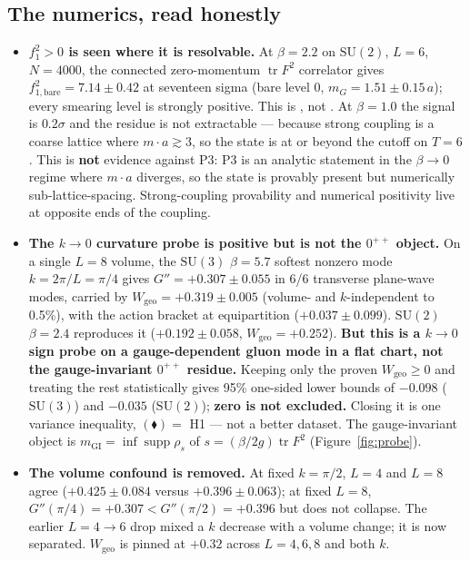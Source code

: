 \subsection{The numerics, read honestly}

\begin{itemize}
\item \textbf{$f_1^2>0$ is seen where it is resolvable.} At $\beta=2.2$ on $\mathrm{SU}(2)$,
  $L=6$, $N=4000$, the connected zero-momentum $\operatorname{tr}F^2$ correlator gives
  $f_{1,\mathrm{bare}}^2=7.14\pm0.42$ at seventeen sigma (bare level 0, $m_G=1.51\pm0.15\,a$);
  every smearing level is strongly positive. This is \LE, not \LT. At $\beta=1.0$ the signal is
  $0.2\sigma$ and the residue is not extractable --- because strong coupling is a coarse lattice
  where $m\cdot a\gtrsim3$, so the state is at or beyond the cutoff on $T=6$. This is \textbf{not}
  evidence against P3: P3 is an analytic statement in the $\beta\to0$ regime where $m\cdot a$
  diverges, so the state is provably present but numerically sub-lattice-spacing. Strong-coupling
  provability and numerical positivity live at opposite ends of the coupling.
\item \textbf{The $k\to0$ curvature probe is positive but is not the $0^{++}$ object.} On a single
  $L=8$ volume, the $\mathrm{SU}(3)$ $\beta=5.7$ softest nonzero mode $k=2\pi/L=\pi/4$ gives
  $G''=+0.307\pm0.055$ in 6/6 transverse plane-wave modes, carried by
  $W_{\mathrm{geo}}=+0.319\pm0.005$ (volume- and $k$-independent to 0.5\%), with the action
  bracket at equipartition ($+0.037\pm0.099$). $\mathrm{SU}(2)$ $\beta=2.4$ reproduces it
  ($+0.192\pm0.058$, $W_{\mathrm{geo}}=+0.252$). \textbf{But this is a $k\to0$ sign probe on a
  gauge-dependent gluon mode in a flat chart, not the gauge-invariant $0^{++}$ residue.} Keeping
  only the proven $W_{\mathrm{geo}}\ge0$ and treating the rest statistically gives 95\% one-sided
  lower bounds of $-0.098$ ($\mathrm{SU}(3)$) and $-0.035$ ($\mathrm{SU}(2)$); \textbf{zero is not
  excluded.} Closing it is one variance inequality, $(\blacklozenge)=$ H1 --- not a better
  dataset. The gauge-invariant object is $m_{\mathrm{GI}}=\inf\operatorname{supp}\rho_s$ of
  $s=(\beta/2g)\operatorname{tr}F^2$ (Figure~\ref{fig:probe}).
\item \textbf{The volume confound is removed.} At fixed $k=\pi/2$, $L=4$ and $L=8$ agree
  ($+0.425\pm0.084$ versus $+0.396\pm0.063$); at fixed $L=8$, $G''(\pi/4)=+0.307<G''(\pi/2)=+0.396$
  but does not collapse. The earlier $L=4\to6$ drop mixed a $k$ decrease with a volume change; it
  is now separated. $W_{\mathrm{geo}}$ is pinned at $+0.32$ across $L=4,6,8$ and both $k$.
\end{itemize}

